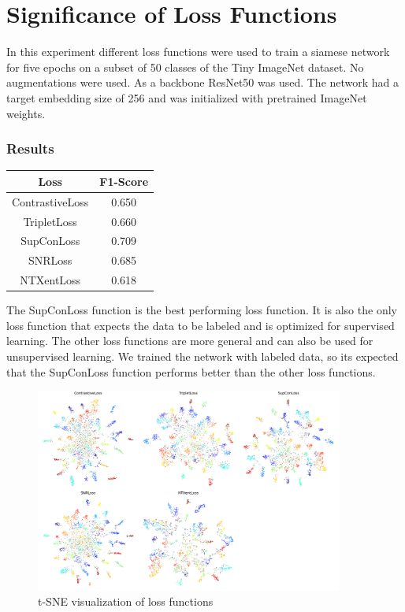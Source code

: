 \documentclass[12pt,a4paper]{report}
\begin{document}
\section{Significance of Loss Functions}

In this experiment different loss functions were used to train a siamese network for five epochs on a subset of 50 classes of the Tiny ImageNet dataset.
No augmentations were used.
As a backbone ResNet50 was used.
The network had a target embedding size of 256 and was initialized with pretrained ImageNet weights.


\subsubsection{Results}
\begin{table}
	\begin{tabular}{ | c | c | }
		\hline
		Loss & F1-Score \\ 
		\hline
		ContrastiveLoss & 0.650 \\ 
		\hline
		TripletLoss & 0.660 \\ 
		\hline
		SupConLoss & 0.709 \\ 
		\hline
		SNRLoss & 0.685 \\ 
		\hline
		NTXentLoss & 0.618 \\ 
		\hline
	\end{tabular}
\end{table} 

The SupConLoss function is the best performing loss function.
It is also the only loss function that expects the data to be labeled and is optimized for supervised learning.
The other loss functions are more general and can also be used for unsupervised learning.
We trained the network with labeled data, so its expected that the SupConLoss function performs better than the other loss functions.


\begin{figure}[hb]
	\centering
	\includegraphics[width=0.9\textwidth]{../plots/losses.png}
	\caption{t-SNE visualization of loss functions}
\end{figure}
\end{document}
